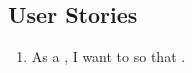 \subsection{User Stories}
\label{sec:user-stories}

\begin{enumerate}[label=\textbf{US\arabic*}]
  \item As a , I want to  so that .
\end{enumerate}
